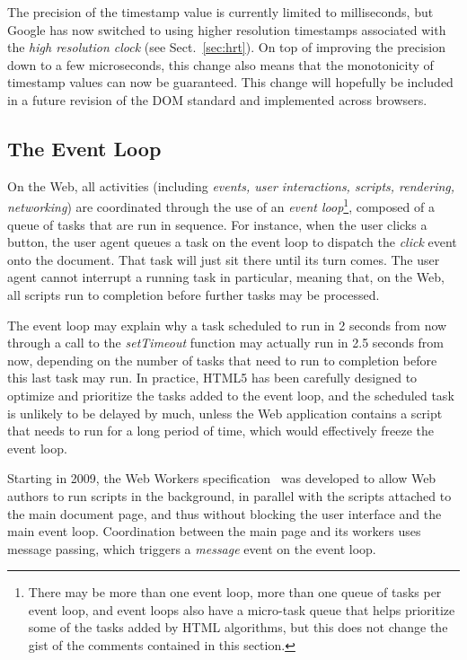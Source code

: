 The precision of the timestamp value is currently limited to milliseconds, but
Google has now switched to using higher resolution timestamps associated with
the \emph{high resolution clock} (see Sect.~\ref{sec:hrt}). On top of
improving the precision down to a few microseconds, this change also means
that the monotonicity of timestamp values can now be guaranteed. This change
will hopefully be included in a future revision of the DOM standard and
implemented across browsers.



\subsection{The Event Loop}
\label{sec:eventloop}

On the Web, all activities (including \emph{events, user interactions,
scripts, rendering, networking}) are coordinated through the use of an
\emph{event loop}\footnote{There may be more than one event loop, more than
one queue of tasks per event loop, and event loops also have a micro-task
queue that helps prioritize some of the tasks added by HTML algorithms, but
this does not change the gist of the comments contained in this section.},
composed of a queue of tasks that are run in sequence. For instance, when the
user clicks a button, the user agent queues a task on the event loop to
dispatch the \emph{click} event onto the document. That task will just sit
there until its turn comes. The user agent cannot interrupt a running task in
particular, meaning that, on the Web, all scripts run to completion before
further tasks may be processed.

The event loop may explain why a task scheduled to run in 2 seconds from now
through a call to the \emph{setTimeout} function may actually run in 2.5 seconds
from now, depending on the number of tasks that need to run to completion
before this last task may run. In practice, HTML5 has been carefully designed
to optimize and prioritize the tasks added to the event loop, and the
scheduled task is unlikely to be delayed by much, unless the Web application
contains a script that needs to run for a long period of time, which would
effectively freeze the event loop.

Starting in 2009, the Web Workers specification~\cite{webworkers} was developed to allow
Web authors to run scripts in the background, in parallel with the scripts
attached to the main document page, and thus without blocking the user
interface and the main event loop. Coordination between the main page and its
workers uses message passing, which triggers a \emph{message} event on the event
loop.

